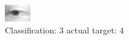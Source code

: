 \begin{figure}[h!]
\begin{center}
\includegraphics[width=0.60\columnwidth]{figures/ID2657_class_3_target_4.png}
\end{center}
\caption{ Classification: 3 actual target: 4}
\label{fig:ID2657_class_3_target_4}
\end{figure}
